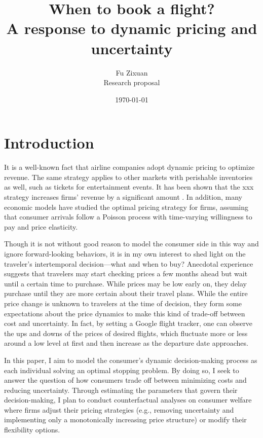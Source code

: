 \documentclass[12pt]{article}
\title{When to book a flight?\\{\large {A response to dynamic pricing and uncertainty}}}
\author{Fu Zixuan \\{\small {Research proposal}}}
\date{\today}
\begin{document}
\maketitle




\section{Introduction}
It is a well-known fact that airline companies adopt dynamic pricing to
optimize revenue. The same strategy applies to other markets with perishable
inventories as well, such as tickets for entertainment events. It has been
shown that the xxx strategy increases firms' revenue by a significant amount
\citep{}. In addition, many economic models have studied the optimal pricing
strategy for firms, assuming that consumer arrivals follow a Poisson process
with time-varying willingness to pay and price elasticity.

Though it is not without good reason to model the consumer side in this way and
ignore forward-looking behaviors, it is in my own interest to shed light on the
traveler's intertemporal decision—what and when to buy? Anecdotal experience
suggests that travelers may start checking prices a few months ahead but wait
until a certain time to purchase. While prices may be low early on, they delay
purchase until they are more certain about their travel plans. While the entire
price change is unknown to travelers at the time of decision, they form some
expectations about the price dynamics to make this kind of trade-off between
cost and uncertainty. In fact, by setting a Google flight tracker, one can
observe the ups and downs of the prices of desired flights, which fluctuate
more or less around a low level at first and then increase as the departure
date approaches.

In this paper, I aim to model the consumer's dynamic decision-making process as
each individual solving an optimal stopping problem. By doing so, I seek to
answer the question of how consumers trade off between minimizing costs and
reducing uncertainty. Through estimating the parameters that govern their
decision-making, I plan to conduct counterfactual analyses on consumer welfare
where firms adjust their pricing strategies (e.g., removing uncertainty and
implementing only a monotonically increasing price structure) or modify their
flexibility options.
\end{document}
